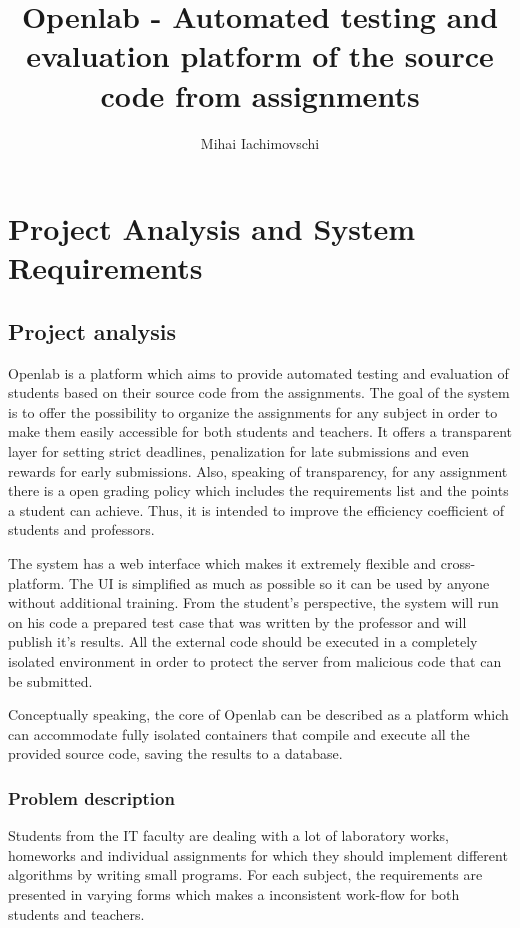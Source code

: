 \documentclass[12pt,oneside,a4paper]{article}
\title{Openlab - Automated testing and evaluation platform of the source code from assignments}
\author{Mihai Iachimovschi}
\date{}
\begin{document}
\maketitle
\clearpage

\renewcommand*\contentsname{Table of contents}
\tableofcontents
\clearpage

\listoffigures
\clearpage
 
\listoftables
\clearpage

\section{Project Analysis and System Requirements}
\subsection{Project analysis}
Openlab is a platform which aims to provide automated testing and evaluation of students based on their source code from the assignments. The goal of the system is to offer the possibility to organize the assignments for any subject in order to make them easily accessible for both students and teachers. It offers a transparent layer for setting strict deadlines, penalization for late submissions and even rewards for early submissions. Also, speaking of transparency, for any assignment there is a open grading policy which includes the requirements list and the points a student can achieve. Thus, it is intended to improve the efficiency coefficient of students and professors.

The system has a web interface which makes it extremely flexible and cross-platform. The UI is simplified as much as possible so it can be used by anyone without additional training. From the student's perspective, the system will run on his code a prepared test case that was written by the professor and will publish it's results. All the external code should be executed in a completely isolated environment in order to protect the server from malicious code that can be submitted.

Conceptually speaking, the core of Openlab can be described as a platform which can accommodate fully isolated containers that compile and execute all the provided source code, saving the results to a database.

\subsubsection{Problem description}
Students from the IT faculty are dealing with a lot of laboratory works, homeworks and individual assignments for which they should implement different algorithms by writing small programs. For each subject, the requirements are presented in varying forms which makes a inconsistent work-flow for both students and teachers.
\end{document}

